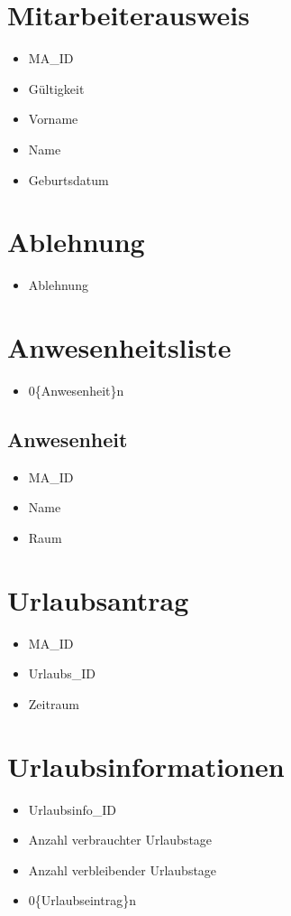 \section{Mitarbeiterausweis}
\begin{itemize}[label=+]
\item[] MA\_ID
\item Gültigkeit
\item Vorname
\item Name
\item Geburtsdatum
\end{itemize}
\section{Ablehnung}
\begin{itemize}
\item[] Ablehnung
\end{itemize}
\section{Anwesenheitsliste}
\begin{itemize}
\item[] 0\{Anwesenheit\}n
\end{itemize}
\subsection{Anwesenheit}
\begin{itemize}[label=+]
\item[] MA\_ID
\item Name
\item Raum
\end{itemize}
\section{Urlaubsantrag}
\begin{itemize}[label=+]
\item[] MA\_ID
\item Urlaubs\_ID
\item Zeitraum
\end{itemize}
\section{Urlaubsinformationen}
\begin{itemize}[label=+]
\item[] Urlaubsinfo\_ID
\item Anzahl verbrauchter Urlaubstage
\item Anzahl verbleibender Urlaubstage
\item 0\{Urlaubseintrag\}n
\end{itemize}
